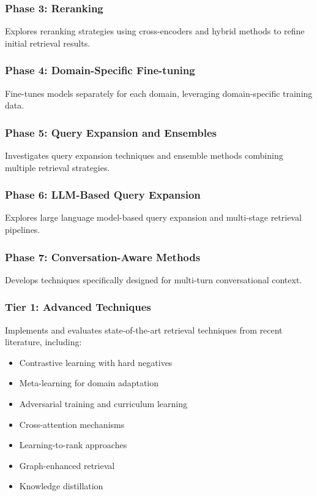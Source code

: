 \documentclass[11pt]{article}
\begin{document}
\subsubsection{Phase 3: Reranking}
Explores reranking strategies using cross-encoders and hybrid methods to refine initial retrieval results.

\subsubsection{Phase 4: Domain-Specific Fine-tuning}
Fine-tunes models separately for each domain, leveraging domain-specific training data.

\subsubsection{Phase 5: Query Expansion and Ensembles}
Investigates query expansion techniques and ensemble methods combining multiple retrieval strategies.

\subsubsection{Phase 6: LLM-Based Query Expansion}
Explores large language model-based query expansion and multi-stage retrieval pipelines.

\subsubsection{Phase 7: Conversation-Aware Methods}
Develops techniques specifically designed for multi-turn conversational context.

\subsubsection{Tier 1: Advanced Techniques}
Implements and evaluates state-of-the-art retrieval techniques from recent literature, including:
\begin{itemize}
    \item Contrastive learning with hard negatives
    \item Meta-learning for domain adaptation
    \item Adversarial training and curriculum learning
    \item Cross-attention mechanisms
    \item Learning-to-rank approaches
    \item Graph-enhanced retrieval
    \item Knowledge distillation
\end{itemize}
\end{document}
